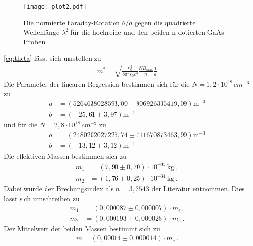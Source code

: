 \begin{figure}[hbt!]
  \texttt{[image: plot2.pdf]}
  \caption{Die normierte Faraday-Rotation $\theta/d$ gegen die quadrierte Wellenlänge $\lambda^2$ für die
  hochreine und den beiden n-dotierten GaAs-Proben.}
  \label{fig:diff}
\end{figure}
\autoref{eq:theta} lässt sich umstellen zu
 \begin{align*}
  m^{*} = \sqrt{\frac{e_0^3}{8\pi^2 \varepsilon_0 c^3} \frac{N B_\text{max}}{n} \frac{1}{a}}
  \end{align*}
Die Parameter der linearen Regression bestimmen sich für die $N=1,2\cdot 10^{18}\,cm^{-3}$ zu
\begin{align*}
  a &= (5264638028593,00 \pm 906926335419,09) \si{\meter}^{-3} \\
  b &= (-25,61 \pm 3,97) \si{\meter}^{-1}
\end{align*}
und für die $N=2,8\cdot 10^{18}\,cm^{-3}$ zu
\begin{align*}
  a &= (2480202027226,74 \pm 711670873463,99) \si{\meter}^{-3} \\
  b &= (-13,12 \pm 3,12) \si{\meter}^{-1}
\end{align*}
Die effektiven Massen bestimmen sich zu
\begin{align*}
  m_1 &= (7,90 \pm 0,70)\cdot 10^{-35}\,\si{\kilogram}\:, \\
  m_2 &= (1,76 \pm 0,25)\cdot 10^{-34}\,\si{\kilogram}\,.
\end{align*}
Dabei wurde der Brechungsindex als $n=3,3543$ der Literatur entnommen. \cite{Brechungsindex}
Dies lässt sich umschreiben zu
\begin{align*}
  m_1 &= (0,000087 \pm 0,000007)\cdot m_{e}, \\
  m_2 &= (0,000193 \pm 0,000028)\cdot m_{e}\: .
\end{align*}
Der Mittelwert der beiden Massen bestimmt sich zu
\begin{align*}
  m = (0,00014 \pm 0,000014)\cdot m_e \,.
\end{align*}